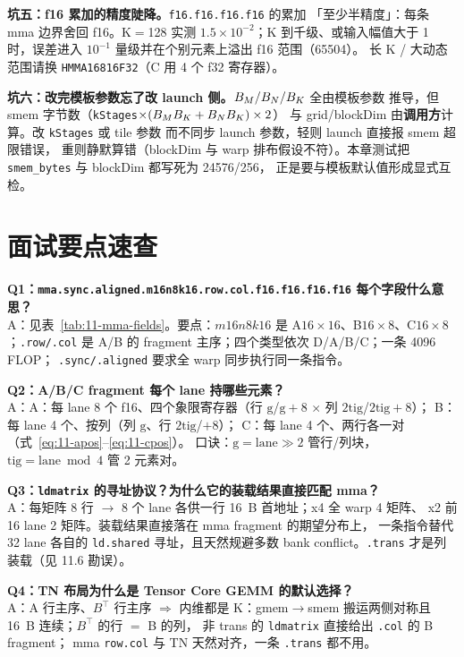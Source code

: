\textbf{坑五：f16 累加的精度陡降。}\texttt{f16.f16.f16.f16} 的累加
「至少半精度」：每条 mma 边界舍回 f16。K$=$128 实测
$1.5\times10^{-2}$；K 到千级、或输入幅值大于 1 时，误差进入
$10^{-1}$ 量级并在个别元素上溢出 f16 范围（65504）。
长 K / 大动态范围请换 \texttt{HMMA16816\allowbreak{}F32}（C 用 4 个 f32 寄存器）。

\textbf{坑六：改完模板参数忘了改 launch 侧。}$B\sb M/B\sb N/B\sb K$ 全由模板参数
推导，但 smem 字节数（\texttt{kStages}$\times(B\sb M B\sb K + B\sb N B\sb K)\times2$）
与 grid/blockDim 由\textbf{调用方}计算。改 \texttt{kStages} 或 tile 参数
而不同步 launch 参数，轻则 launch 直接报 smem 超限错误，
重则静默算错（blockDim 与 warp 排布假设不符）。本章测试把
\texttt{smem\_bytes} 与 blockDim 都写死为 24576/256，
正是要与模板默认值形成显式互检。

\section{面试要点速查}

\textbf{Q1：\texttt{mma.\allowbreak{}sync.\allowbreak{}aligned.\allowbreak{}m16n8k16.row.\allowbreak{}col.\allowbreak{}f16.f16.f16.f16}
每个字段什么意思？}\\
A：见表~\ref{tab:11-mma-fields}。要点：$m16n8k16$ 是
A$16\times16$、B$16\times8$、C$16\times8$；\texttt{.row/.col} 是 A/B 的
fragment 主序；四个类型依次 D/A/B/C；一条 4096 FLOP；
\texttt{.\allowbreak{}sync/\allowbreak{}.\allowbreak{}aligned} 要求全 warp 同步执行同一条指令。

\textbf{Q2：A/B/C fragment 每个 lane 持哪些元素？}\\
A：A：每 lane 8 个 f16、四个象限寄存器（行 $\mathrm{g}$/$\mathrm{g}{+}8$
$\times$ 列 $2\mathrm{tig}$/$2\mathrm{tig}{+}8$）；
B：每 lane 4 个、按列（列 $\mathrm{g}$、行 $2\mathrm{tig}$/$+8$）；
C：每 lane 4 个、两行各一对（式~\ref{eq:11-apos}--\ref{eq:11-cpos}）。
口诀：$\mathrm{g} = \mathrm{lane} \gg 2$ 管行/列块，$\mathrm{tig} = \mathrm{lane} \bmod 4$ 管 2 元素对。

\textbf{Q3：\texttt{ldmatrix} 的寻址协议？为什么它的装载结果直接匹配 mma？}\\
A：每矩阵 8 行 $\to$ 8 个 lane 各供一行 16~B 首地址；x4 全 warp 4 矩阵、
x2 前 16 lane 2 矩阵。装载结果直接落在 mma fragment 的期望分布上，
一条指令替代 32 lane 各自的 \texttt{ld.shared} 寻址，且天然规避多数
bank conflict。\texttt{.trans} 才是列装载（见 11.6 勘误）。

\textbf{Q4：TN 布局为什么是 Tensor Core GEMM 的默认选择？}\\
A：A 行主序、$B^{\top}$ 行主序 $\Rightarrow$ 内维都是 K：gmem$\to$smem
搬运两侧对称且 16~B 连续；$B^{\top}$ 的行 $=$ B 的列，
非 trans 的 \texttt{ldmatrix} 直接给出 \texttt{.col} 的 B fragment；
mma \texttt{row.col} 与 TN 天然对齐，一条 \texttt{.trans} 都不用。

